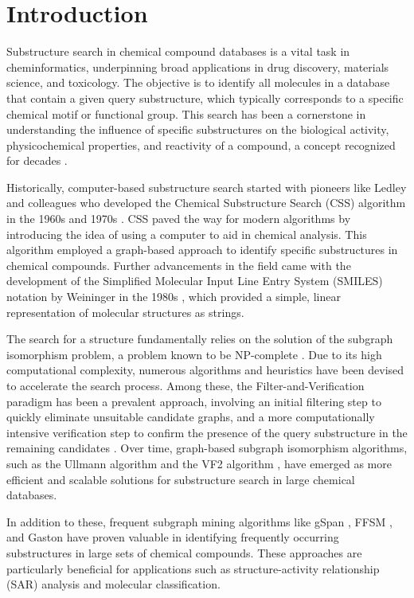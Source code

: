 \section{Introduction}
Substructure search in chemical compound databases is a vital task in cheminformatics, underpinning broad applications in drug discovery, 
materials science, and toxicology. The objective is to identify all molecules in a database that contain a given query substructure, which 
typically corresponds to a specific chemical motif or functional group. This search has been a cornerstone in understanding the influence
of specific substructures on the biological activity, physicochemical properties, and reactivity of a compound, a concept recognized for
decades \cite{barnard1993}.

Historically, computer-based substructure search started with pioneers like Ledley and colleagues who developed the Chemical Substructure 
Search (CSS) algorithm in the 1960s and 1970s \cite{ledley1964}. CSS paved the way for modern algorithms by introducing the idea of using 
a computer to aid in chemical analysis. This algorithm employed a graph-based approach to identify specific 
substructures in chemical compounds. Further advancements in the field came with the development of the Simplified Molecular Input 
Line Entry System (SMILES) notation by Weininger in the 1980s \cite{weininger1988}, which provided a simple, linear representation 
of molecular structures as strings.

The search for a structure fundamentally relies  on the solution of the subgraph isomorphism problem, a problem known to be NP-complete \cite{ullmann1976}. 
Due to its high computational complexity, numerous algorithms and heuristics have been devised to accelerate the search process. 
Among these, the Filter-and-Verification paradigm has been a prevalent approach, involving an initial filtering step to quickly 
eliminate unsuitable candidate graphs, and a more computationally intensive verification step to confirm the presence of the query 
substructure in the remaining candidates \cite{cordella2004, shasha2002}. Over time, graph-based subgraph isomorphism algorithms, 
such as the Ullmann algorithm \cite{ullmann1976} and the VF2 algorithm \cite{cordella2004}, have emerged as more efficient and 
scalable solutions for substructure search in large chemical databases.

In addition to these, frequent subgraph mining algorithms like gSpan \cite{yan2002}, FFSM \cite{kuramochi2001}, and Gaston \cite{nijssen2004} 
have proven valuable in identifying frequently occurring substructures in large sets of chemical compounds. These approaches 
are particularly beneficial for applications such as structure-activity relationship (SAR) analysis and molecular classification.

